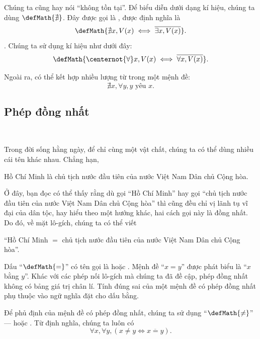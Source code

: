 Chúng ta cũng hay nói ``không tồn tại''. Để biểu diễn dưới dạng kí hiệu, chúng ta dùng $\defMath{\nexists}$. Đây được gọi là , được định nghĩa là
\begin{equation*}
   \defMath{\nexists x, V(x) \iff \overline{\exists x, V(x)}}. 
\end{equation*}
. Chúng ta sử dụng kí hiệu như dưới đây:
\begin{equation*}
   \defMath{\centernot{\forall} x, V(x) \iff \overline{\forall x, V(x)}}.
\end{equation*}

Ngoài ra, có thể kết hợp nhiều lượng từ trong một mệnh đề:
\begin{equation*}
   \nexists x, \forall y, y\text{ yêu }x.    
\end{equation*}

\subsection{Phép đồng nhất}

\ 

Trong đời sống hằng ngày, để chỉ cùng một vật chất, chúng ta có thể dùng nhiều cái tên khác nhau. Chẳng hạn,
\begin{center}
   Hồ Chí Minh là chủ tịch nước đầu tiên của nước Việt Nam Dân chủ Cộng hòa.
\end{center}
Ở đây, bạn đọc có thể thấy rằng dù gọi ``Hồ Chí Minh'' hay gọi ``chủ tịch nước đầu tiên của nước Việt Nam Dân chủ Cộng hòa'' thì cũng đều chỉ vị lãnh tụ vĩ đại của dân tộc, hay hiểu theo một hướng khác, hai cách gọi này là đồng nhất. Do đó, về mặt lô-gích, chúng ta có thể viết
\begin{center}
   ``Hồ Chí Minh $=$ chủ tịch nước đầu tiên của nước Việt Nam Dân chủ Cộng hòa''.
\end{center}
Dấu ``$\defMath{=}$'' có tên gọi là  hoặc . Mệnh đề ``$x = y$'' được phát biểu là ``$x$ bằng $y$''. Khác với các phép nối lô-gích mà chúng ta đã đề cập, phép đồng nhất không có bảng giá trị chân lí. Tính đúng sai của một mệnh đề có phép đồng nhất phụ thuộc vào ngữ nghĩa đặt cho dấu bằng. 

Để phủ định của mệnh đề có phép đồng nhất, chúng ta sử dụng ``$\defMath{\neq}$'' ---  hoặc . Từ định nghĩa, chúng ta luôn có $$\forall x, \forall y, (x \neq y \iff \overline{x = y}).$$ 

